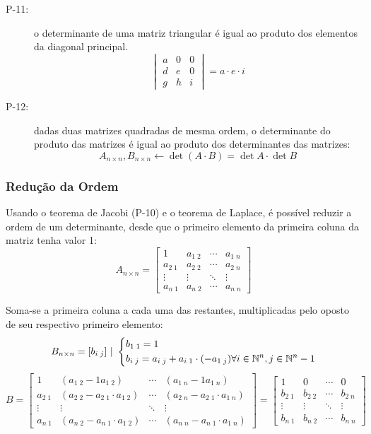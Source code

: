 \begin{description}
            \item[P-11:] o determinante de uma matriz triangular é igual ao produto dos elementos da diagonal principal. \eg
            \[ \begin{vmatrix} a & 0 & 0 \\ d & e & 0 \\ g & h & i \end{vmatrix} = a \cdot e \cdot i \]
            \item[P-12:] dadas duas matrizes quadradas de mesma ordem, o determinante do produto das matrizes é igual ao produto dos determinantes das matrizes:
            \[ A_{n \times n}, B_{n \times n} \leftarrow \det{(A \cdot B)} = \det{A} \cdot \det{B} \]
        \end{description}
    \subsubsection{Redução da Ordem}
        Usando o teorema de Jacobi (P-10) e o teorema de Laplace, é possível reduzir a ordem de um determinante, desde que o primeiro elemento da primeira coluna da matriz tenha valor 1:
        \[ A_{n \times n} = \begin{bmatrix} 1 & a_{1 \; 2} & \cdots & a_{1 \; n} \\ a_{2 \; 1} & a_{2 \; 2} & \cdots & a_{2 \; n} \\ \vdots & \vdots & \ddots & \vdots \\ a_{n \; 1} & a_{n \; 2} & \cdots  & a_{n \; n} \end{bmatrix} \]
        
        Soma-se a primeira coluna a cada uma das restantes, multiplicadas pelo oposto de seu respectivo primeiro elemento:
        \[ B_{n \times n} = [b_{i \; j}] \ | \ \begin{dcases} b_{1 \; 1} = 1 \\ b_{i \; j} = a_{i \; j} + a_{i \; 1} \cdot (-a_{1 \; j}) \forall i \in \mathbb{N}^n, j \in \mathbb{N}^n -1 \end{dcases} \]
        \[ B = \begin{bmatrix} 1 & (a_{1 \; 2} -1 a_{1 \; 2}) & \cdots & (a_{1 \; n} -1 a_{1 \; n}) \\ a_{2 \; 1} & (a_{2 \; 2} - a_{2 \; 1} \cdot a_{1 \; 2}) & \cdots & (a_{2 \; n} - a_{2 \; 1} \cdot a_{1 \; n}) \\ \vdots & \vdots & \ddots & \vdots \\ a_{n \; 1} & (a_{n \; 2} - a_{n \; 1} \cdot a_{1 \; 2}) & \cdots  & (a_{n \; n} - a_{n \; 1} \cdot a_{1 \; n}) \end{bmatrix} = \begin{bmatrix} 1 & 0 & \cdots & 0 \\ b_{2 \; 1} & b_{2 \; 2} & \cdots & b_{2 \; n} \\ \vdots & \vdots & \ddots & \vdots \\ b_{n \; 1} & b_{n \; 2} & \cdots  & b_{n \; n} \end{bmatrix} \]
        
